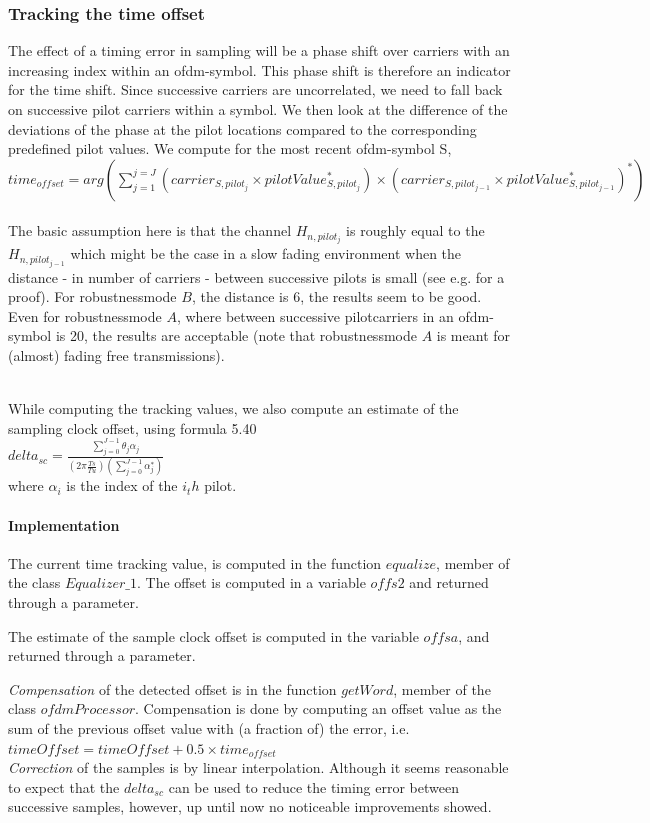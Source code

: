 \documentclass[11pt]{article}
\begin{document}
\subsubsection{Tracking the time offset}
The effect of a timing error in sampling will be a phase shift over 
carriers with an increasing index within an ofdm-symbol.
This phase shift is therefore an indicator for the time shift.
Since successive carriers are uncorrelated, we need to fall back on successive
pilot carriers within a symbol.
We then look at the difference of the deviations of the phase at the
pilot locations compared to the corresponding predefined pilot values.
We compute for the most recent ofdm-symbol S,
\ \\
{
$time_{offset} = arg (\sum_{j=1}^{j=J} (carrier_{S, pilot_j} \times pilotValue_{S, pilot_j}^*) \times (carrier_{S,pilot_{j - 1}} \times pilotValue_{S, pilot_{j - 1}}^*)^*)$
}
\ \\
The basic assumption here is that the channel $H_{n, pilot_j}$ is
roughly equal to the $H_{n, pilot_{j - 1}}$ which might be the case
in a slow fading environment when the distance - in number
of carriers - between successive pilots is small
(see e.g. \cite{Chang} for a proof).
For robustnessmode $B$, the distance is 6, the results
seem to be good. Even for robustnessmode $A$,
where between successive pilotcarriers in an ofdm-symbol is 20,
the results
are acceptable (note that robustnessmode $A$ is meant for (almost)
fading free transmissions).

\ \\
While computing the tracking values, we also compute an estimate of
the sampling clock offset, using \cite{Tsai} formula 5.40
{
\ \\
$delta_{sc} = \frac{\sum_{j=0}^{J-1} \theta_j \alpha_j}{(2 \pi \frac{Ts}{Tu})(\sum_{j=0}^{J-1} \alpha_j^*)}$
\ \\
}
where $\alpha_i$ is the index of the $i_th$ pilot.
\paragraph{Implementation}
The current time tracking value, is computed in the function
$equalize$, member of the class $Equalizer\_1$. The offset is
computed in a variable $offs2$ and returned through a parameter.

The estimate of the sample clock offset is computed in the variable $offsa$,
and returned through a parameter.

{\em Compensation} of the detected offset is in the function $getWord$,
member of the class $ofdmProcessor$.
Compensation is done by computing an offset value
as the sum of the previous offset value with (a fraction of) the error, i.e.
{
\ \\
$timeOffset = timeOffset + 0.5 \times time_{offset}$
\ \\
}
{\em Correction} of the samples is by linear interpolation.
Although it seems reasonable
to expect that the $delta_{sc}$ can be used to reduce the timing error
between successive samples, however, up until now no
noticeable improvements showed.
\end{document}
